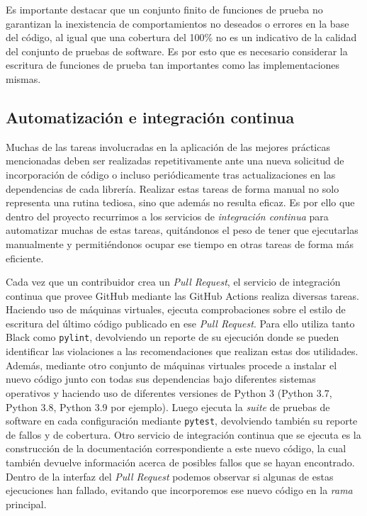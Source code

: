 Es importante destacar que un conjunto finito de funciones de prueba no
garantizan la inexistencia de comportamientos no deseados o errores en la base
del código, al igual que una cobertura del 100\% no es un indicativo de la
calidad del conjunto de pruebas de software.
Es por esto que es necesario considerar la escritura de funciones de prueba tan
importantes como las implementaciones mismas.


\subsection{Automatización e integración continua}
\label{sec:ci}

Muchas de las tareas involucradas en la aplicación de las mejores prácticas
mencionadas deben ser realizadas repetitivamente ante una nueva solicitud de
incorporación de código o incluso periódicamente tras actualizaciones en las
dependencias de cada librería.
Realizar estas tareas de forma manual no solo representa una rutina tediosa,
sino que además no resulta eficaz.
Es por ello que dentro del proyecto recurrimos a los servicios de
\emph{integración continua} para automatizar muchas de estas tareas,
quitándonos el peso de tener que ejecutarlas manualmente y permitiéndonos
ocupar ese tiempo en otras tareas de forma más eficiente.

Cada vez que un contribuidor crea un \emph{Pull Request}, el servicio de
integración continua que provee GitHub mediante las GitHub Actions realiza
diversas tareas.
Haciendo uso de máquinas virtuales, ejecuta comprobaciones sobre el estilo de
escritura del último código publicado en ese \emph{Pull Request}.
Para ello utiliza tanto Black como \texttt{pylint}, devolviendo un reporte de
su ejecución donde se pueden identificar las violaciones a las recomendaciones
que realizan estas dos utilidades.
Además, mediante otro conjunto de máquinas virtuales procede a instalar el
nuevo código junto con todas sus dependencias bajo diferentes sistemas
operativos y haciendo uso de diferentes versiones de Python 3 (Python 3.7,
Python 3.8, Python 3.9 por ejemplo).
Luego ejecuta la \emph{suite} de pruebas de software en cada configuración
mediante \texttt{pytest}, devolviendo también su reporte de fallos y de
cobertura.
Otro servicio de integración continua que se ejecuta es la construcción de la
documentación correspondiente a este nuevo código, la cual también devuelve
información acerca de posibles fallos que se hayan encontrado.
Dentro de la interfaz del \emph{Pull Request} podemos observar si algunas de
estas ejecuciones han fallado, evitando que incorporemos ese nuevo código en la
\emph{rama} principal.

